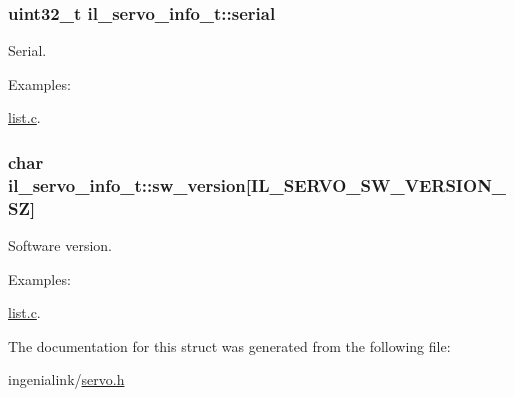 \subsubsection[{\texorpdfstring{serial}{serial}}]{\setlength{\rightskip}{0pt plus 5cm}uint32\+\_\+t il\+\_\+servo\+\_\+info\+\_\+t\+::serial}\hypertarget{structil__servo__info__t_a0ae637a9d167672496e381e23c5cd5d5}{}\label{structil__servo__info__t_a0ae637a9d167672496e381e23c5cd5d5}


Serial. 

\begin{Desc}
\item[Examples\+: ]\par
\hyperlink{list_8c-example}{list.\+c}.\end{Desc}
\subsubsection[{\texorpdfstring{sw\+\_\+version}{sw_version}}]{\setlength{\rightskip}{0pt plus 5cm}char il\+\_\+servo\+\_\+info\+\_\+t\+::sw\+\_\+version\mbox{[}{\bf I\+L\+\_\+\+S\+E\+R\+V\+O\+\_\+\+S\+W\+\_\+\+V\+E\+R\+S\+I\+O\+N\+\_\+\+SZ}\mbox{]}}\hypertarget{structil__servo__info__t_ad08af6ad43a8c261812fa9775bc4fc08}{}\label{structil__servo__info__t_ad08af6ad43a8c261812fa9775bc4fc08}


Software version. 

\begin{Desc}
\item[Examples\+: ]\par
\hyperlink{list_8c-example}{list.\+c}.\end{Desc}


The documentation for this struct was generated from the following file\+:\begin{DoxyCompactItemize}
\item 
ingenialink/\hyperlink{servo_8h}{servo.\+h}\end{DoxyCompactItemize}

